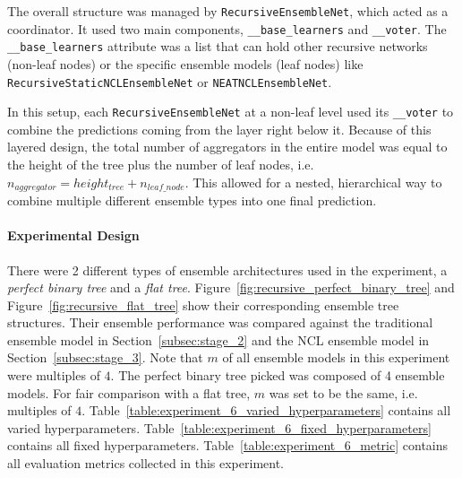 The overall structure was managed by \texttt{RecursiveEnsembleNet}, which acted as a coordinator. It used two main components, \texttt{\_\_base\_learners} and \texttt{\_\_voter}. The \texttt{\_\_base\_learners} attribute was a list that can hold other recursive networks (non-leaf nodes) or the specific ensemble models (leaf nodes) like 
\\
\texttt{RecursiveStaticNCLEnsembleNet} or \texttt{NEATNCLEnsembleNet}. 

In this setup, each \texttt{RecursiveEnsembleNet} at a non-leaf level used its \texttt{\_\_voter} to combine the predictions coming from the layer right below it. Because of this layered design, the total number of aggregators in the entire model was equal to the height of the tree plus the number of leaf nodes, i.e. $n_{aggregator} = height_{tree} + n_{leaf\_node}$. This allowed for a nested, hierarchical way to combine multiple different ensemble types into one final prediction. 


\paragraph{Experimental Design}
There were 2 different types of ensemble architectures used in the experiment, a \textit{perfect binary tree} and a \textit{flat tree}. Figure~\ref{fig:recursive_perfect_binary_tree} and Figure~\ref{fig:recursive_flat_tree} show their corresponding ensemble tree structures. Their ensemble performance was compared against the traditional ensemble model in Section~\ref{subsec:stage_2} and the NCL ensemble model in Section~\ref{subsec:stage_3}. Note that $m$ of all ensemble models in this experiment were multiples of $4$. The perfect binary tree picked was composed of 4 ensemble models. For fair comparison with a flat tree, $m$ was set to be the same, i.e. multiples of $4$. Table~\ref{table:experiment_6_varied_hyperparameters} contains all varied hyperparameters. Table~\ref{table:experiment_6_fixed_hyperparameters} contains all fixed hyperparameters. Table~\ref{table:experiment_6_metric} contains all evaluation metrics collected in this experiment. 

